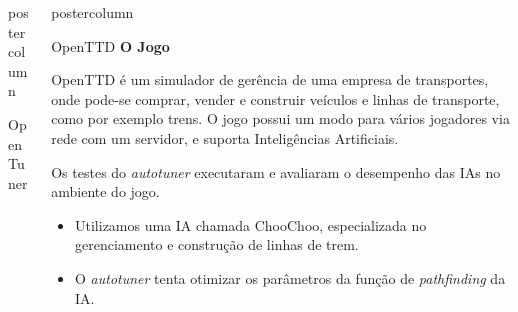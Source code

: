 \documentclass[final]{beamer}
\newlength{\columnheight}
\begin{document}
\begin{frame}
\begin{columns}
\begin{column}{.5\textwidth}
\begin{beamercolorbox}[center,wd=\textwidth]{postercolumn}
\begin{minipage}[T]{.95\textwidth}
{\begin{block}{OpenTuner}
                \vspace*{0.2cm} 
            \end{block}
                        
            \vspace*{0.2cm}
          }
        \end{minipage}
      \end{beamercolorbox}
    \end{column}

    \begin{column}{.5\textwidth}
      \begin{beamercolorbox}[center,wd=\textwidth]{postercolumn}
        \begin{minipage}[T]{.95\textwidth} %
          \parbox[t][\columnheight]{\textwidth}{ %
            
            \vspace*{0.8cm}
            
            \begin{block}{OpenTTD}
                \textbf{O Jogo}
                
                  OpenTTD é um simulador de gerência de uma empresa de transportes, onde pode-se comprar, vender e construir veículos e linhas de transporte, como por exemplo trens. O jogo possui um modo para vários jogadores via rede com um servidor, e suporta Inteligências Artificiais.
                
                \vspace*{0.2cm}
                Os testes do \textit{autotuner} executaram e avaliaram o desempenho das IAs no ambiente do jogo.
                \begin{itemize}
                  \item Utilizamos uma IA chamada ChooChoo, especializada no gerenciamento e construção de linhas de trem.
                  \item O \textit{autotuner} tenta otimizar os parâmetros da função de \textit{pathfinding} da IA.
                \end{itemize}  
                         

\end{block}}
\end{minipage}
\end{beamercolorbox}
\end{column}
\end{columns}
\end{frame}
\end{document}
